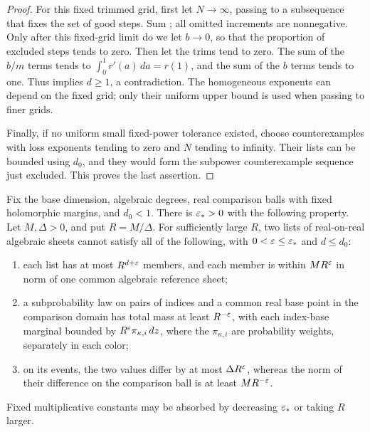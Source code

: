\begin{proof}
For this fixed trimmed grid, first let \(N\to\infty\), passing to
a subsequence that fixes the set of good steps.  Sum
; all omitted increments are nonnegative.
Only after this fixed-grid limit do we let \(b\to0\), so that the
proportion of excluded steps tends to zero.  Then let the trims tend
to zero.  The sum of the
\(b/m\) terms tends to
\(\int_0^1r'(a)\,da=r(1)\), and the sum of the \(b\) terms tends
to one.  Thus  implies \(d\ge1\), a
contradiction.  The homogeneous exponents can depend on the fixed
grid; only their uniform upper bound is used when passing to
finer grids.

Finally, if no uniform small fixed-power tolerance existed, choose
counterexamples with loss exponents tending to zero and \(N\)
tending to infinity.  Their lists can be bounded using \(d_0\),
and they would form the subpower counterexample sequence just
excluded.  This proves the last assertion.
\end{proof}


\begin{corollary}
\label{a02:local-graph-matching}
Fix the base dimension, algebraic degrees, real comparison balls
with fixed holomorphic margins, and \(d_0<1\).  There is
\(\varepsilon_*>0\) with the following property.  Let \(M,\Delta>0\), and put
\(R=M/\Delta\).
For sufficiently large \(R\), two lists of real-on-real algebraic
sheets cannot satisfy all of the following, with
\(0<\varepsilon\le\varepsilon_*\) and \(d\le d_0\):
\begin{enumerate}
\item each list has at most \(R^{d+\varepsilon}\) members, and each member
is within \(M R^\varepsilon\) in norm of one common algebraic reference
sheet;
\item a subprobability law on pairs of indices and a common real
base point in the comparison domain has total mass at least
\(R^{-\varepsilon}\), with each index-base marginal bounded by
\(R^\varepsilon\pi_{\kappa,i}\,dz\), where the \(\pi_{\kappa,i}\) are
probability weights, separately in each color;
\item on its events, the two values differ by at most
\(\Delta R^\varepsilon\), whereas the norm of their difference on the
comparison ball is at least \(M R^{-\varepsilon}\).
\end{enumerate}
Fixed multiplicative constants may be absorbed by decreasing
\(\varepsilon_*\) or taking \(R\) larger.
\end{corollary}

